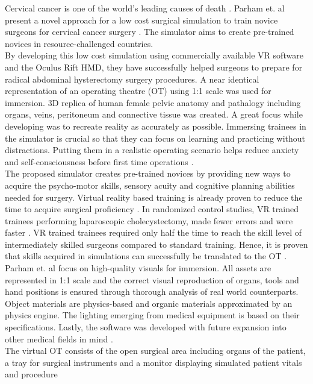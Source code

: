Cervical cancer is one of the world’s leading causes of death \cite{Parham.2019}.
Parham et. al present a novel approach for a low cost surgical simulation to train novice
surgeons for cervical cancer surgery \cite{Parham.2019}. The simulator aims to create pre-trained novices
in resource-challenged countries. 
\\ By developing this low cost simulation using commercially available VR software and the
Oculus Rift HMD, they have successfully helped surgeons to prepare for radical abdominal
hysterectomy surgery procedures. A near identical representation of an operating theatre (OT)
using 1:1 scale was used for immersion. 3D replica of human female pelvic anatomy and
pathalogy including organs, veins, peritoneum and connective tissue was created. A
great focus while developing was to recreate reality as accurately as possible.
Immersing trainees in the simulator is crucial so that they can focus on learning and practicing without
distractions. Putting them in a realistic operating scenario helps reduce anxiety and
self-consciousness before first time operations \cite{Parham.2019}.
\\ The proposed simulator creates pre-trained novices by providing new ways to acquire the psycho-motor skills,
sensory acuity and cognitive planning abilities needed for surgery.
Virtual reality based training is already proven to reduce the time to acquire surgical proficiency
\cite{RN61,RN62}. In randomized control studies, VR trained trainees performing laparoscopic cholecystectomy, made fewer errors and were faster \cite{RN63,RN64}. VR trained trainees required only
half the time to reach the skill level of intermediately skilled surgeons compared to standard training.
Hence, it is proven that skills acquired in simulations can successfully be translated to the OT \cite{RN63,RN64}.
\\ Parham et. al focus on high-quality visuals for immersion. All assets are represented
in 1:1 scale and the correct visual reproduction of organs, tools and hand positions is
ensured through thorough analysis of real world counterparts. Object materials are
physics-based and organic materials approximated by an physics engine. The lighting
emerging from medical equipment is based on their specifications. Lastly, the software
was developed with future expansion into other medical fields in mind \cite{Parham.2019}.
\\ The virtual OT consists of the open surgical area including organs of the patient, a tray
for surgical instruments and a monitor displaying simulated patient vitals and procedure

